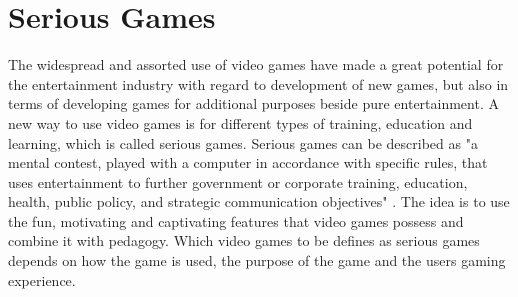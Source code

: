 \section{Serious Games}
The widespread and assorted use of video games have made a great potential for the entertainment industry with regard to development of new games, but also in terms of developing games for additional purposes beside pure entertainment. A new way to use video games is for different types of training, education and learning, which is called serious games. Serious games can be described as "a mental contest, played with a computer in accordance with specific rules, that uses entertainment to further government or corporate training, education, health, public policy, and strategic communication objectives" \cite{zyda2005visual}. The idea is to use the fun, motivating and captivating features that video games possess and combine it with pedagogy. Which video games to be defines as serious games depends on how the game is used, the purpose of the game and the users gaming experience. 

